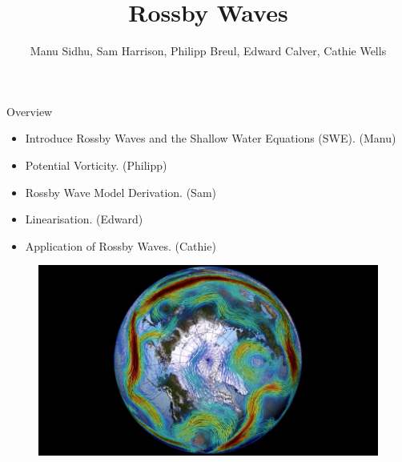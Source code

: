 \documentclass[12pt]{beamer}
\title[Rossby Waves]{Rossby Waves}
\author{Manu Sidhu, Sam Harrison, Philipp Breul, Edward Calver, Cathie Wells}
\institute{University of Reading and Imperial College London}
\begin{document}
	
	\begin{frame}
	\titlepage
\end{frame}

\begin{frame}{Overview}

\begin{itemize}
	\item Introduce Rossby Waves and the Shallow Water Equations (SWE). (Manu)
	\item Potential Vorticity. (Philipp)
	\item Rossby Wave Model Derivation. (Sam)
	\item Linearisation. (Edward)
	\item Application of Rossby Waves. (Cathie)
\end{itemize}

\begin{figure}[H]
	\centering
	\includegraphics[width=0.5\linewidth]{Rossby_Wave.jpg}
\end{figure}   

\end{frame}
\end{document}
